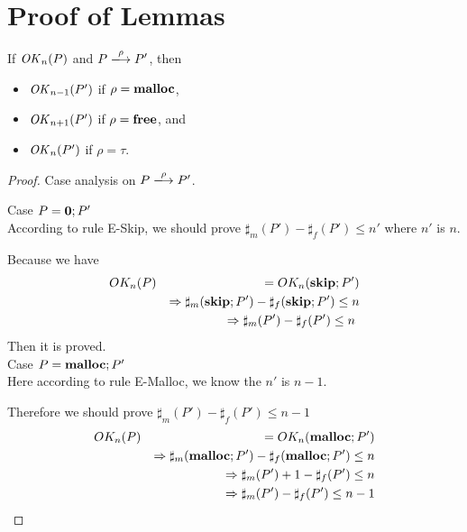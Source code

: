 \section{Proof of Lemmas}
\label{sec:proof}

\begin{lemma}
\label{lem:okPreserved}
If \(\mathit{OK}_n(P)\) and \(P \xlongrightarrow{\rho} P'\), then
\begin{itemize}
\item \(\mathit{OK}_{n-1}(P')\) if \(\rho = \mathbf{malloc}\),
\item \(\mathit{OK}_{n+1}(P')\) if \(\rho = \mathbf{free}\), and
\item \(\mathit{OK}_n(P')\) if \(\rho = \tau\).
\end{itemize}
\end{lemma}
\begin{proof}

Case analysis on \(P \xlongrightarrow{\rho} P'\).


\noindent Case $P = \mathbf{0};P'$\\

According to rule E-Skip, we should prove
$\sharp_{m}(P')-\sharp_{f}(P') \le n'$ where $n'$ is $n$.

Because we have
\begin{eqnarray*}
  OK_{n}(P)  & & =  OK_{n}(\mathbf{skip};P')\\
  & & \Rightarrow \sharp_{m}(\mathbf{skip};P') - \sharp_{f}(\mathbf{skip};P') \le n \\
  & & \Rightarrow \sharp_{m}(P') - \sharp_{f}(P') \le n \
\end{eqnarray*}
Then it is proved. \\

\noindent Case $P = \mathbf{malloc};P'$ \\

Here according to rule E-Malloc, we know the $n'$ is $n-1$.

Therefore we should prove $\sharp_{m}(P') - \sharp_{f}(P') \le n-1$
\begin{eqnarray*}
  OK_{n}(P)&& =  OK_{n}(\mathbf{malloc};P')\\
  &&\Rightarrow \sharp_{m}(\mathbf{malloc};P') - \sharp_{f}(\mathbf{malloc};P') \le n \\
  &&\Rightarrow  \sharp_{m}(P') + 1 - \sharp_{f}(P') \le n\\
  &&\Rightarrow  \sharp_{m}(P')  - \sharp_{f}(P') \le n-1\\
\end{eqnarray*}


\end{proof}

